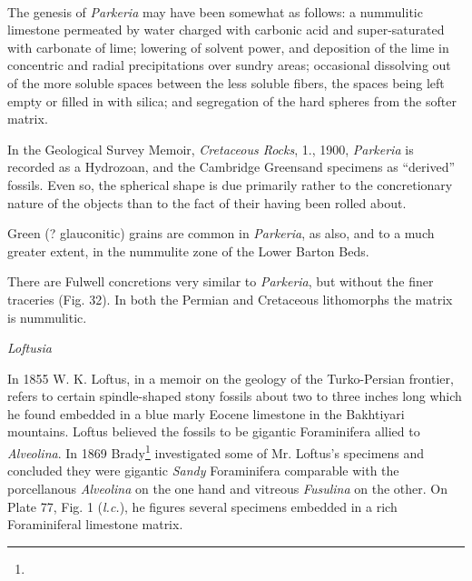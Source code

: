 \documentclass[a4paper, 12pt, oneside]{article}
\begin{document}
\paragraph{}
The genesis of \emph{Parkeria} may have been somewhat as follows: a nummulitic limestone permeated by water charged with carbonic acid and super-saturated with carbonate of lime; lowering of solvent power, and deposition of the lime in concentric and radial precipitations over sundry areas; occasional dissolving out of the more soluble spaces between the less soluble fibers, the spaces being left empty or filled in with silica; and segregation of the hard spheres from the softer matrix.

In the Geological Survey Memoir, \emph{Cretaceous Rocks}, 1., 1900, \emph{Parkeria} is recorded as a Hydrozoan, and the Cambridge Greensand specimens as ``derived'' fossils. Even so, the spherical shape is due primarily rather to the concretionary nature of the objects than to the fact of their having been rolled about.

Green (? glauconitic) grains are common in \emph{Parkeria}, as also, and to a much greater extent, in the nummulite zone of the Lower Barton Beds.

There are Fulwell concretions very similar to \emph{Parkeria}, but without the finer traceries (Fig. 32). In both the Permian and Cretaceous lithomorphs the matrix is nummulitic.

\bigskip
\centerline{\emph{Loftusia}}

In 1855 W. K. Loftus, in a memoir on the geology of the Turko-Persian frontier, refers to certain spindle-shaped stony fossils about two to three inches long which he found embedded in a blue marly Eocene limestone in the Bakhtiyari mountains. Loftus believed the fossils to be gigantic Foraminifera allied to \emph{Alveolina}. In 1869 Brady\footnote{} investigated some of Mr. Loftus's specimens and concluded they were gigantic \emph{Sandy} Foraminifera comparable with the porcellanous \emph{Alveolina} on the one hand and vitreous \emph{Fusulina} on the other. On Plate 77, Fig. 1 (\emph{l.c.}), he figures several specimens embedded in a rich Foraminiferal limestone matrix.
\end{document}
